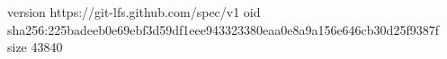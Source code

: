 version https://git-lfs.github.com/spec/v1
oid sha256:225badeeb0e69ebf3d59df1eee943323380eaa0e8a9a156e646cb30d25f9387f
size 43840
